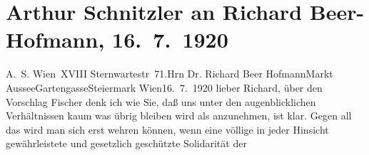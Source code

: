 

         
         \renewcommand{\erwaehntePersonen}{Personen: Richard Beer-Hofmann, Samuel Fischer, Hugo von Hofmannsthal, Lucy von Jacobi, Olga Schnitzler}
         \renewcommand{\erwaehnteOrte}{Orte: Abtenau, Bad Aussee, Bayern, Gartengasse, Kurhaus Abtenau-Bad, Salzburg, Steiermark, Sternwartestraße, Wien}
         \renewcommand{\erwaehnteWerke}{Werke: Gesammelte Werke}
               \section[Arthur Schnitzler an Richard Beer-Hofmann, 16. 7. 1920]{ Arthur Schnitzler an Richard Beer-Hofmann, 16. 7. 1920}\nopagebreak{}\rehead{ }\begin{ledgroupsized}[t]{13cm}\normalsize\beginnumbering{} \toendnotes[C]{\smallbreak\pagebreak[2]} 
\toendnotes[C]{\smallbreak}\pstart{}{\pb}A. S. Wien XVIII
                     Sternwartestr 71.\pend{}{\bigskip}\pstart{}{\pb}Hrn Dr. Richard Beer Hofmann\pend{}\pstart{}Markt Aussee\pend{}\pstart{}Gartengasse\pend{}\pstart{}Steiermark\pend{}{\bigskip}\pstart
           \raggedleft{}{\pb}Wien16. 7. 1920\pend
           \pstart{}lieber Richard,\pend\pstart
           über den Vorschlag Fischer denk ich wie Sie,
               daß uns unter den augenblicklichen Verhältnissen kaum was übrig bleiben wird als
               anzunehmen, ist klar. Gegen all das wird man sich erst wehren können, wenn eine
               völlige in jeder Hinsicht gewährleistete und gesetzlich geschützte Solidarität der

\end{ledgroupsized}
